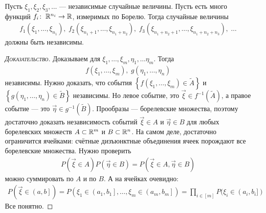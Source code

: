 \documentclass[../main.tex]{subfiles}
\begin{document}
\begin{thm}
 Пусть $ \xi_1, \xi_2, \xi_3, \ldots $ --- независимые случайные величины. Пусть есть много функций $ f_i \colon\;\mathbb{R}^{n_i} \to \mathbb{R} $, измеримых по Борелю. Тогда случайные величины
 \begin{align*}
  f_1(\xi_1, \ldots, \xi_{n_1}),\; f_2(\xi_{n_1 + 1}, \ldots, \xi_{n_1 + n_2}),\; f_3(\xi_{n_1 + n_2 + 1}, \ldots, \xi_{n_1 + n_2 + n_3}),\; \ldots
 \end{align*} должны быть независимы.
\end{thm}
\begin{proof}[\normalfont\textsc{Доказательство}]
 Доказываем для $ \xi_1, \ldots, \xi_m, \eta_1, \ldots \eta_m $. Тогда
 \begin{align*}
  f(\xi_1, \ldots, \xi_m),\;g(\eta_1, \ldots, \eta_n)
\end{align*}  независимы. Нужно доказать, что события $ \left \{ f(\xi_1, \ldots,\xi_m) \in \tilde A \right \} $ и $ \left\{ g(\eta_1, \ldots, \eta_n) \in \tilde B \right\} $ независимы. Но левое событие, это $ \vec\xi \in f^{-1}(\tilde A) $, а правое событие --- это $ \vec\eta \in g^{-1}(\tilde B) $. Прообразы --- борелевские множества, поэтому достаточно доказать независимость событий $ \vec\xi \in A $ и $ \vec\eta \in B $ для любых борелевских множеств $ A \subset\mathbb{R}^{m} $ и $ B \subset \mathbb{R}^{n} $. На самом деле, достаточно ограничится ячейками: счётные дизъюнктные объединения ячеек порождают все борелевские множества. Нужно проверить
 \begin{align*}
  P(\vec\xi \in A) P(\vec\eta \in B) = P(\vec\xi \in A, \vec\eta \in B)
 \end{align*} можно суммировать по $ A $ и по $ B $. А на ячейках очевидно:
 \begin{align*}
	 P(\vec\xi \in \left(a, b\right]  ) = P(\xi_1 \in \left(a_1, b_1\right], \ldots, \xi_m \in \left(a_m, b_m\right]    ) = \prod_{i \in [m]}P(\xi_i \in (a_i, b_i])
 \end{align*} Все понятно.
\end{proof}
\end{document}
